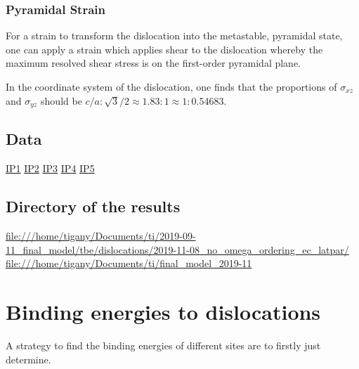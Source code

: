 \documentclass[11pt]{article}
\begin{document}
\subsubsection{Pyramidal Strain}
\label{sec:org30fddb4}

For a strain to transform the dislocation into the metastable,
pyramidal state, one can apply a strain which applies shear to the
dislocation whereby the maximum resolved shear stress is on the
first-order pyramidal plane. 

In the coordinate system of the dislocation, one finds that the
proportions of \(\sigma_{xz}\) and \(\sigma_{yz}\) should be \(c/a : \sqrt{3}/2 \approx
    1.83 : 1 \approx 1 : 0.54683\).


\subsection{Data}
\label{sec:orgac3ae2e}
\href{file:///home/tigany/Documents/ti/final\_model\_2019-11-12/results\_2019-11-09\_muc/IP1-oo\_19-11-09--04-46-00.log}{IP1}
\href{file:///home/tigany/Documents/ti/final\_model\_2019-11-12/results\_2019-11-09\_muc/IP2-oo\_19-11-09--04-46-00.log}{IP2}
\href{file:///home/tigany/Documents/ti/final\_model\_2019-11-12/results\_2019-11-09\_muc/IP3-oo\_19-11-09--04-46-00.log}{IP3}
\href{file:///home/tigany/Documents/ti/final\_model\_2019-11-12/results\_2019-11-09\_muc/IP4-oo\_19-11-09--04-46-00.log}{IP4}
\href{file:///home/tigany/Documents/ti/final\_model\_2019-11-12/results\_2019-11-09\_muc/IP5-oo\_19-11-09--04-46-00.log}{IP5}

\subsection{Directory of the results}
\label{sec:orge389787}
\url{file:///home/tigany/Documents/ti/2019-09-11\_final\_model/tbe/dislocations/2019-11-08\_no\_omega\_ordering\_ec\_latpar/}
\url{file:///home/tigany/Documents/ti/final\_model\_2019-11}


\section{Binding energies to dislocations}
\label{sec:orgdb8c9ef}

A strategy to find the binding energies of different sites are to
firstly just determine. 
\end{document}
